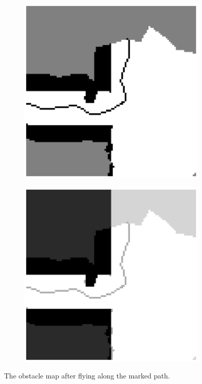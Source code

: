 \begin{figure}[!t]
\begin{subfigure}[b]{0.48\linewidth}
    \centering
    \includegraphics[width= 1.2\linewidth]{Figures/radar_after_flying}
    \caption{}
    \label{fig:Combined_obstacle_map}
\end{subfigure}
\begin{subfigure}[b]{0.48\linewidth}
    \centering
    \includegraphics[width= 1.2\linewidth]{Figures/radar_after_flying_superimposed}
    \caption{}
\end{subfigure}
\caption{The obstacle map after flying along the marked path.  }
\end{figure}

